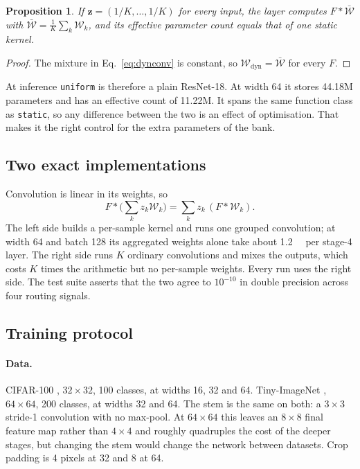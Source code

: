 \documentclass[10pt,a4paper]{article}
\newtheorem{proposition}{Proposition}
\newcommand{\zv}{\mathbf{z}}
\begin{document}
\begin{proposition}\label{prop:collapse}
If $\zv=(1/K,\dots,1/K)$ for every input, the layer computes
$F*\bar{\mathcal{W}}$ with $\bar{\mathcal{W}}=\tfrac1K\sum_k\mathcal{W}_k$,
and its effective parameter count equals that of one static kernel.
\end{proposition}
\begin{proof}
The mixture in Eq.~\eqref{eq:dynconv} is constant, so
$\mathcal{W}_{\text{dyn}}=\bar{\mathcal{W}}$ for every $F$.
\end{proof}

At inference \texttt{uniform} is therefore a plain ResNet-18. At width 64
it stores 44.18M parameters and has an effective count of 11.22M. It
spans the same function class as \texttt{static}, so any difference
between the two is an effect of optimisation. That makes it the right
control for the extra parameters of the bank.

\subsection{Two exact implementations}

Convolution is linear in its weights, so
\begin{equation}
F*\Big(\sum_k z_k\mathcal{W}_k\Big)=\sum_k z_k\,(F*\mathcal{W}_k).
\label{eq:lin}
\end{equation}
The left side builds a per-sample kernel and runs one grouped
convolution; at width 64 and batch 128 its aggregated weights alone take
about \SI{1.2}{\giga\byte} per stage-4 layer. The right side runs $K$
ordinary convolutions and mixes the outputs, which costs $K$ times the
arithmetic but no per-sample weights. Every run uses the right side. The
test suite asserts that the two agree to $10^{-10}$ in double precision
across four routing signals.

\subsection{Training protocol}

\paragraph{Data.} CIFAR-100 \citep{krizhevsky2009}, $32\times32$, 100
classes, at widths 16, 32 and 64. Tiny-ImageNet \citep{le2015tiny},
$64\times64$, 200 classes, at widths 32 and 64. The stem is the same on
both: a $3\times3$ stride-1 convolution with no max-pool. At
$64\times64$ this leaves an $8\times8$ final feature map rather than
$4\times4$ and roughly quadruples the cost of the deeper stages, but
changing the stem would change the network between datasets. Crop
padding is 4 pixels at 32 and 8 at 64.
\end{document}
